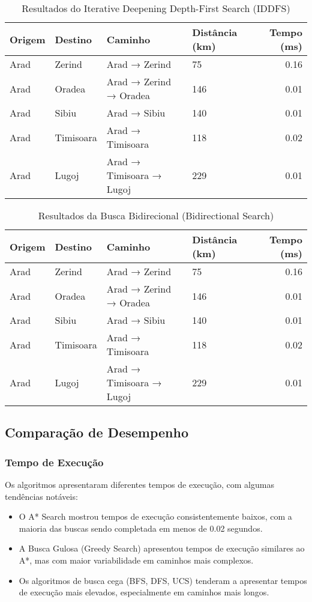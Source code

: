 \documentclass[12pt,a4paper]{article}
\begin{document}
\begin{table}[H]
\centering
\caption{Resultados do Iterative Deepening Depth-First Search (IDDFS)}
\begin{tabular}{llllr}
\toprule
Origem & Destino & Caminho & Distância (km) & Tempo (ms) \\
\midrule
Arad & Zerind & Arad → Zerind & 75 & 0.16 \\
Arad & Oradea & Arad → Zerind → Oradea & 146 & 0.01 \\
Arad & Sibiu & Arad → Sibiu & 140 & 0.01 \\
Arad & Timisoara & Arad → Timisoara & 118 & 0.02 \\
Arad & Lugoj & Arad → Timisoara → Lugoj & 229 & 0.01 \\
\bottomrule
\end{tabular}
\end{table}

\begin{table}[H]
\centering
\caption{Resultados da Busca Bidirecional (Bidirectional Search)}
\begin{tabular}{llllr}
\toprule
Origem & Destino & Caminho & Distância (km) & Tempo (ms) \\
\midrule
Arad & Zerind & Arad → Zerind & 75 & 0.16 \\
Arad & Oradea & Arad → Zerind → Oradea & 146 & 0.01 \\
Arad & Sibiu & Arad → Sibiu & 140 & 0.01 \\
Arad & Timisoara & Arad → Timisoara & 118 & 0.02 \\
Arad & Lugoj & Arad → Timisoara → Lugoj & 229 & 0.01 \\
\bottomrule
\end{tabular}
\end{table}

\subsection{Comparação de Desempenho}

\subsubsection{Tempo de Execução}
Os algoritmos apresentaram diferentes tempos de execução, com algumas tendências notáveis:

\begin{itemize}
    \item O A* Search mostrou tempos de execução consistentemente baixos, com a maioria das buscas sendo completada em menos de 0.02 segundos.
    \item A Busca Gulosa (Greedy Search) apresentou tempos de execução similares ao A*, mas com maior variabilidade em caminhos mais complexos.
    \item Os algoritmos de busca cega (BFS, DFS, UCS) tenderam a apresentar tempos de execução mais elevados, especialmente em caminhos mais longos.
\end{itemize}
\end{document}
